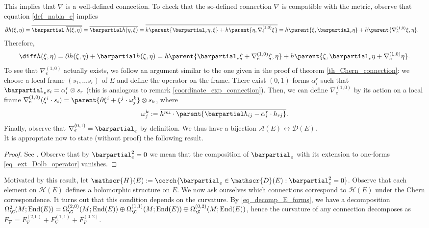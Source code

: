This implies that \(\nabla\) is a well-defined connection. To check that the so-defined connection \(\nabla\) is compatible with the metric, observe that equation \eqref{def_nabla_e} implies
\begin{align*}
    \partial h(\xi, \eta) & = \overline{\barpartial \ \overline{h(\xi, \eta)}} = \overline{\barpartial h(\eta, \xi)} = \overline{h\parent{\barpartial_e \eta, \xi} + h\parent{\eta, \nabla_e^{(1,0)}\xi}} = h\parent{\xi, \barpartial_e \eta} + h\parent{\nabla_e^{(1,0)}\xi, \eta}.    
\end{align*}
Therefore, 
\[
\diff h(\xi, \eta) = \partial h(\xi, \eta) +  \barpartial h(\xi, \eta) = h\parent{\barpartial_e\xi + \nabla_e^{(1,0)}\xi, \eta} + h\parent{\xi, \barpartial_e \eta + \nabla^{(1,0)}_e \eta}.
\]
 To see that \(\nabla_e^{(1,0)}\) actually exists, we follow an argument similar to the one given in the proof of theorem \ref{th_Chern_connection}: we choose a local frame \((s_1, \ldots s_r)\) of \(E\) and define the operator on the frame. There exist \((0,1)\)-forms \(\alpha^r_i\) such that \(\barpartial_e s_i=\alpha^r_i \otimes s_r\) (this is analogous to remark \ref{coordinate_exp_connection}). Then, we can define \(\nabla_e^{(1,0)}\) by its action on a local frame \(\nabla_e^{(1,0)} (\xi^i \cdot s_i)=\parent{\partial \xi^i + \xi^j \cdot \omega ^k_j} \otimes s_k  \), where
 \[
 \omega^k_j := \overline{h^{mi}\cdot \parent{\barpartial h_{ij}-\alpha^r_i \cdot h_{rj}}}.
 \]
 Finally, observe that \(\nabla_e^{(0,1)}=\barpartial_e\) by definition. We thus have a bijection \(\mathscr{A}(E) \leftrightarrow \mathscr{D}(E)\).\\

 It is appropriate now to state (without proof) the following result.

 \begin{proof}
    See \parencite[I-Prop. 3.7]{kobayashi_complex_vector_bundles}. Observe that by \(\barpartial_e^2=0\) we mean that the composition of \(\barpartial_e\) with its extension to one-forms \eqref{eq_ext_Dolb_operator} vanishes.
 \end{proof}
 Motivated by this result, let \(\mathscr{H}(E):=\corch{\barpartial_e \in \mathscr{D}(E): \barpartial_e^2=0}\). Observe that each element on \(\mathscr{H}(E)\) defines a holomorphic structure on \(E\). We now ask ourselves which connections correspond to \(\mathscr{H}(E)\) under the Chern correspondence. It turns out that this condition depends on the curvature. By \eqref{eq_decomp_E_forms}, we have a decomposition \(\Omega_\C^2(M;\mathrm{End}(E))=\Omega_\C^{(2,0)}(M; \mathrm{End}(E))\oplus \Omega_\C^{(1,1)}(M; \mathrm{End}(E)) \oplus \Omega_\C^{(0,2)}(M; \mathrm{End}(E))\), hence the curvature of any connection decomposes as \(F_\nabla=F_{\nabla}^{(2,0)}+F_\nabla^{(1,1)}+F_\nabla^{(0,2)}\).

